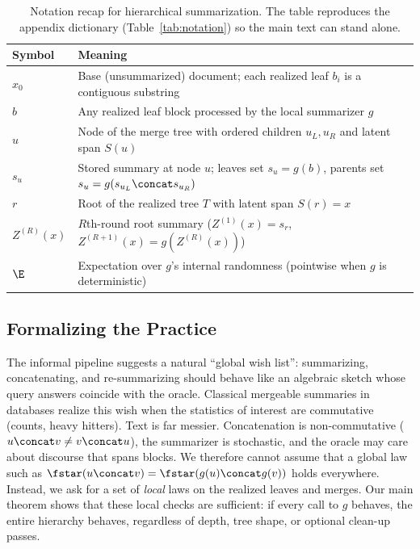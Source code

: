 \begin{table}[t]
\centering
\begin{tabular}{ll}
\toprule
Symbol & Meaning \\
\midrule
$x_0$ & Base (unsummarized) document; each realized leaf $b_i$ is a contiguous substring \\
$b$ & Any realized leaf block processed by the local summarizer $g$ \\
$u$ & Node of the merge tree with ordered children $u_L,u_R$ and latent span $S(u)$ \\
$s_u$ & Stored summary at node $u$; leaves set $s_u = g(b)$, parents set $s_u = g(s_{u_L} \concat s_{u_R})$ \\
$r$ & Root of the realized tree $T$ with latent span $S(r) = x$ \\
$Z^{(R)}(x)$ & $R$th-round root summary ($Z^{(1)}(x) = s_r$, $Z^{(R+1)}(x) = g(Z^{(R)}(x))$) \\
$\E$ & Expectation over $g$'s internal randomness (pointwise when $g$ is deterministic) \\
\bottomrule
\end{tabular}
\caption{Notation recap for hierarchical summarization. The table reproduces the appendix dictionary (Table~\ref{tab:notation}) so the main text can stand alone.}
\label{tab:notation-main}
\end{table}

\subsection{Formalizing the Practice}

The informal pipeline suggests a natural ``global wish list'': summarizing, concatenating, and re-summarizing should behave like an algebraic sketch whose query answers coincide with the oracle. Classical mergeable summaries in databases \citep{agarwal2013mergeable} realize this wish when the statistics of interest are commutative (counts, heavy hitters). Text is far messier. Concatenation is non-commutative ($u \concat v \neq v \concat u$), the summarizer is stochastic, and the oracle may care about discourse that spans blocks. We therefore cannot assume that a global law such as $\fstar(u \concat v) = \fstar(g(u) \concat g(v))$ holds everywhere. Instead, we ask for a set of \emph{local} laws on the realized leaves and merges. Our main theorem shows that these local checks are sufficient: if every call to $g$ behaves, the entire hierarchy behaves, regardless of depth, tree shape, or optional clean-up passes.

